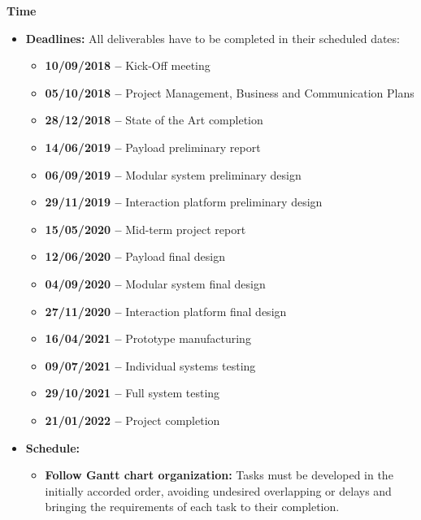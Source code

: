 \textbf{Time}

\begin{itemize}
	
	\item \textbf{Deadlines:} All deliverables have to be completed in their scheduled dates:
	
	\begin{itemize}
		
		\item \textbf{10/09/2018 – } Kick-Off meeting 
		
		\item \textbf{05/10/2018 – } Project Management, Business and Communication Plans
		
		\item \textbf{28/12/2018 – } State of the Art completion
		
		\item \textbf{14/06/2019 – } Payload preliminary report
		
		\item \textbf{06/09/2019 – } Modular system preliminary design
		
		\item \textbf{29/11/2019 – } Interaction platform preliminary design
		
		\item \textbf{15/05/2020 – } Mid-term project report
		
		\item \textbf{12/06/2020 – } Payload final design
		
		\item \textbf{04/09/2020 – } Modular system final design 
		
		\item \textbf{27/11/2020 – } Interaction platform final design
		
		\item \textbf{16/04/2021 – } Prototype manufacturing
		
		\item \textbf{09/07/2021 – } Individual systems testing 
		
		\item \textbf{29/10/2021 – } Full system testing
		
		\item \textbf{21/01/2022 – } Project completion
		
	\end{itemize}
	
	\item \textbf{Schedule:}
	
	\begin{itemize}
		\item \textbf{Follow Gantt chart organization:} Tasks must be developed in the initially accorded order, avoiding undesired overlapping or delays and bringing the requirements of each task to their completion.
	\end{itemize}
	

\end{itemize}

